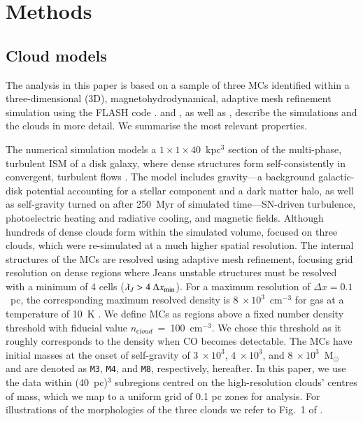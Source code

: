 \section{Methods}\label{methods}


\subsection{Cloud models}\label{methods:clouds}

The analysis in this paper is based on a sample of three MCs identified within a three-dimensional (3D), magnetohydrodynamical, adaptive mesh refinement simulation using the FLASH code \citep{Fryxell2000}.  
 and , as well as \citet[ hereafter]{Chira2018}, describe the simulations and the clouds in more detail. 
We summarise the most relevant properties. 

The numerical simulation models a $1\times1\times40$~kpc$^3$ section of the multi-phase, turbulent ISM of a disk galaxy, where dense structures form self-consistently in convergent, turbulent flows .  
The model includes gravity---a background galactic-disk potential accounting for a stellar component and a dark matter halo, as well as self-gravity turned on after 250~Myr of simulated time---SN-driven turbulence, photoelectric heating and radiative cooling, and magnetic fields. 
Although hundreds of dense clouds form within the simulated volume,  focused on three clouds, which were re-simulated at a much higher spatial resolution.
The internal structures of the MCs are resolved using adaptive mesh refinement, focusing grid resolution on dense regions where Jeans unstable structures must be resolved with a minimum of 4 cells ($\lambda_J > 4~\Delta x_{\rm min}$).
For a maximum resolution of $\Delta x = 0.1$~pc, the corresponding maximum resolved density is $8~\times 10^3$~cm$^{-3}$ for gas at a temperature of 10~K . 
We define MCs as regions above a fixed number density threshold with fiducial value $n_{\mathrm cloud}$~=~100~cm$^{-3}$.
We chose this threshold as it roughly corresponds to the density when CO becomes detectable.
The MCs have initial masses at the onset of self-gravity of $3~\times 10^3$, $4~\times 10^3$, and $8~\times 10^3$~M$_{\odot}$ and are denoted as \texttt{M3}, \texttt{M4}, and \texttt{M8}, respectively, hereafter. 
In this paper, we use the data within (40~pc)$^{3}$ subregions centred on the high-resolution clouds' centres of mass, which we map to a uniform grid of 0.1 pc zones for analysis.
For illustrations of the morphologies of the three clouds we refer to Fig.~1 of .

